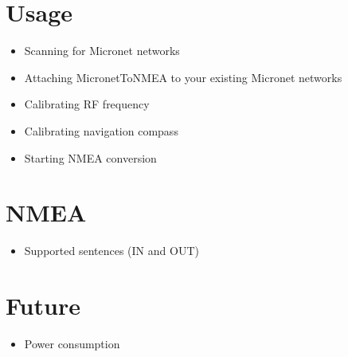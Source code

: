 \documentclass{report}
\begin{document}
\chapter{Usage}

\begin{itemize}
\item Scanning for Micronet networks
\item Attaching MicronetToNMEA to your existing Micronet networks
\item Calibrating RF frequency
\item Calibrating navigation compass
\item Starting NMEA conversion
\end{itemize}

\chapter{NMEA}

\begin{itemize}
\item Supported sentences (IN and OUT)
\end{itemize}

\chapter{Future}

\begin{itemize}
\item Power consumption
\end{itemize}
\end{document}
